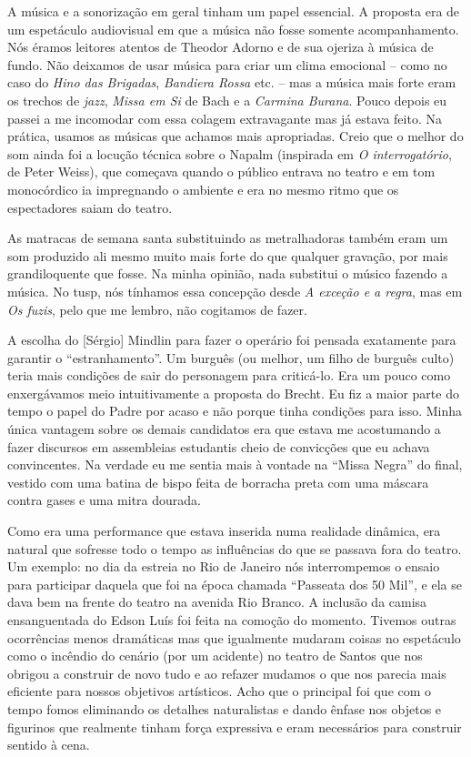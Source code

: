 A música e a sonorização em geral tinham um papel essencial. A proposta
era de um espetáculo audiovisual em que a música não fosse somente
acompanhamento. Nós éramos leitores atentos de Theodor Adorno e de sua
ojeriza à música de fundo. Não deixamos de usar música para criar um
clima emocional -- como no caso do {\it Hino das Brigadas},
{\it Bandiera Rossa} etc. -- mas a música mais forte eram os trechos de
{\it jazz}, {\it Missa em Si} de Bach e a {\it Carmina Burana}. Pouco
depois eu passei a me incomodar com essa colagem extravagante mas já
estava feito. Na prática, usamos as músicas que achamos mais
apropriadas. Creio que o melhor do som ainda foi a locução técnica sobre
o Napalm (inspirada em {\it O interrogatório}, de Peter Weiss), que
começava quando o público entrava no teatro e em tom monocórdico ia
impregnando o ambiente e era no mesmo ritmo que os espectadores saiam do
teatro.

As matracas de semana santa substituindo as metralhadoras também eram um
som produzido ali mesmo muito mais forte do que qualquer gravação, por
mais grandiloquente que fosse. Na minha opinião, nada substitui o músico
fazendo a música. No {\sc tusp}, nós tínhamos essa concepção desde {\it A
exceção e a regra}, mas em {\it Os fuzis}, pelo que me lembro, não
cogitamos de fazer.

A escolha do {[}Sérgio{]} Mindlin para fazer o operário foi pensada
exatamente para garantir o “estranhamento”. Um burguês (ou melhor, um
filho de burguês culto) teria mais condições de sair do personagem para
criticá-lo. Era um pouco como enxergávamos meio intuitivamente a
proposta do Brecht. Eu fiz a maior parte do tempo o papel do Padre por
acaso e não porque tinha condições para isso. Minha única vantagem sobre
os demais candidatos era que estava me acostumando a fazer discursos em
assembleias estudantis cheio de convicções que eu achava convincentes.
Na verdade eu me sentia mais à vontade na “Missa Negra” do final,
vestido com uma batina de bispo feita de borracha preta com uma máscara
contra gases e uma mitra dourada.

Como era uma performance que estava inserida numa realidade dinâmica,
era natural que sofresse todo o tempo as influências do que se passava
fora do teatro. Um exemplo: no dia da estreia no Rio de Janeiro nós
interrompemos o ensaio para participar daquela que foi na época chamada
“Passeata dos 50 Mil”, e ela se dava bem na frente do teatro na avenida
Rio Branco. A inclusão da camisa ensanguentada do Edson Luís foi feita
na comoção do momento. Tivemos outras ocorrências menos dramáticas mas
que igualmente mudaram coisas no espetáculo como o incêndio do cenário
(por um acidente) no teatro de Santos que nos obrigou a construir de
novo tudo e ao refazer mudamos o que nos parecia mais eficiente para
nossos objetivos artísticos. Acho que o principal foi que com o tempo
fomos eliminando os detalhes naturalistas e dando ênfase nos objetos e
figurinos que realmente tinham força expressiva e eram necessários para
construir sentido à cena.

